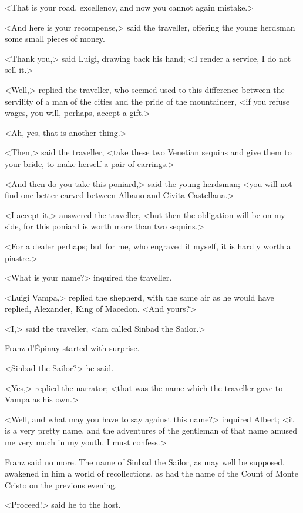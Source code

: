 {<That is your road, excellency, and now you cannot again mistake.> 

<And here is your recompense,> said the traveller, offering the young herdsman some small pieces of money. 

<Thank you,> said Luigi, drawing back his hand; <I render a service, I do not sell it.> 

<Well,> replied the traveller, who seemed used to this difference between the servility of a man of the cities and the pride of the mountaineer, <if you refuse wages, you will, perhaps, accept a gift.> 

<Ah, yes, that is another thing.> 

<Then,> said the traveller, <take these two Venetian sequins and give them to your bride, to make herself a pair of earrings.> 

<And then do you take this poniard,> said the young herdsman; <you will not find one better carved between Albano and Civita-Castellana.> 

<I accept it,> answered the traveller, <but then the obligation will be on my side, for this poniard is worth more than two sequins.> 

<For a dealer perhaps; but for me, who engraved it myself, it is hardly worth a piastre.> 

<What is your name?> inquired the traveller. 

<Luigi Vampa,> replied the shepherd, with the same air as he would have replied, Alexander, King of Macedon. <And yours?> 

<I,> said the traveller, <am called Sinbad the Sailor.>}

 Franz d'Épinay started with surprise. 

 <Sinbad the Sailor?> he said. 

 <Yes,> replied the narrator; <that was the name which the traveller gave to Vampa as his own.> 

 <Well, and what may you have to say against this name?> inquired Albert; <it is a very pretty name, and the adventures of the gentleman of that name amused me very much in my youth, I must confess.> 

 Franz said no more. The name of Sinbad the Sailor, as may well be supposed, awakened in him a world of recollections, as had the name of the Count of Monte Cristo on the previous evening. 

 <Proceed!> said he to the host. 

